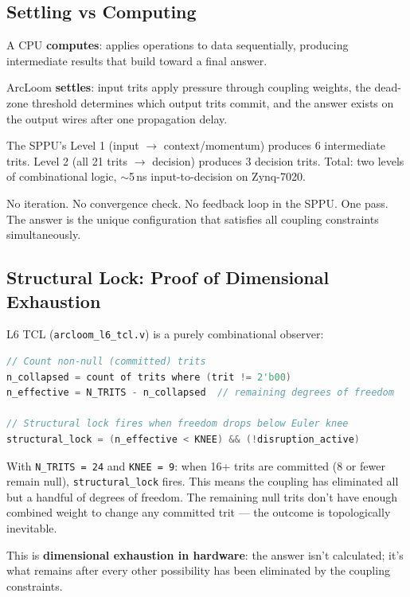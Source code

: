 \documentclass[11pt,a4paper]{article}
\begin{document}
\subsection{Settling vs Computing}

A CPU \textbf{computes}: applies operations to data sequentially, producing intermediate results that build toward a final answer.

ArcLoom \textbf{settles}: input trits apply pressure through coupling weights, the dead-zone threshold determines which output trits commit, and the answer exists on the output wires after one propagation delay.

The SPPU's Level 1 (input $\rightarrow$ context/momentum) produces 6 intermediate trits. Level 2 (all 21 trits $\rightarrow$ decision) produces 3 decision trits. Total: two levels of combinational logic, $\sim$5\,ns input-to-decision on Zynq-7020.

No iteration. No convergence check. No feedback loop in the SPPU. One pass. The answer is the unique configuration that satisfies all coupling constraints simultaneously.

\subsection{Structural Lock: Proof of Dimensional Exhaustion}

L6 TCL (\texttt{arcloom\_l6\_tcl.v}) is a purely combinational observer:
\begin{lstlisting}[language=Verilog]
// Count non-null (committed) trits
n_collapsed = count of trits where (trit != 2'b00)
n_effective = N_TRITS - n_collapsed  // remaining degrees of freedom

// Structural lock fires when freedom drops below Euler knee
structural_lock = (n_effective < KNEE) && (!disruption_active)
\end{lstlisting}

With \texttt{N\_TRITS = 24} and \texttt{KNEE = 9}: when 16+ trits are committed (8 or fewer remain null), \texttt{structural\_lock} fires. This means the coupling has eliminated all but a handful of degrees of freedom. The remaining null trits don't have enough combined weight to change any committed trit --- the outcome is topologically inevitable.

This is \textbf{dimensional exhaustion in hardware}: the answer isn't calculated; it's what remains after every other possibility has been eliminated by the coupling constraints.
\end{document}
